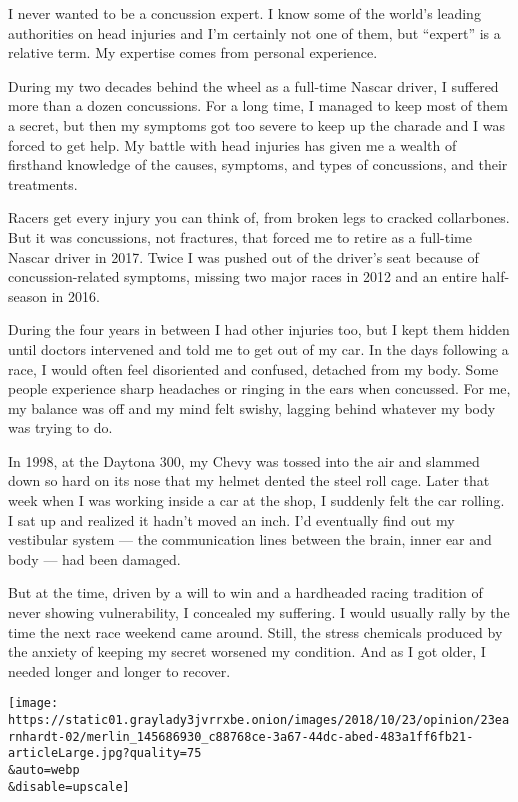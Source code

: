 I never wanted to be a concussion expert. I know some of the world's
leading authorities on head injuries and I'm certainly not one of them,
but ``expert'' is a relative term. My expertise comes from personal
experience.

During my two decades behind the wheel as a full-time Nascar driver, I
suffered more than a dozen concussions. For a long time, I managed to
keep most of them a secret, but then my symptoms got too severe to keep
up the charade and I was forced to get help. My battle with head
injuries has given me a wealth of firsthand knowledge of the causes,
symptoms, and types of concussions, and their treatments.

Racers get every injury you can think of, from broken legs to cracked
collarbones. But it was concussions, not fractures, that forced me to
retire as a full-time Nascar driver in 2017. Twice I was pushed out of
the driver's seat because of concussion-related symptoms, missing two
major races in 2012 and an entire half-season in 2016.

During the four years in between I had other injuries too, but I kept
them hidden until doctors intervened and told me to get out of my car.
In the days following a race, I would often feel disoriented and
confused, detached from my body. Some people experience sharp headaches
or ringing in the ears when concussed. For me, my balance was off and my
mind felt swishy, lagging behind whatever my body was trying to do.

In 1998, at the Daytona 300, my Chevy was tossed into the air and
slammed down so hard on its nose that my helmet dented the steel roll
cage. Later that week when I was working inside a car at the shop, I
suddenly felt the car rolling. I sat up and realized it hadn't moved an
inch. I'd eventually find out my vestibular system --- the communication
lines between the brain, inner ear and body --- had been damaged.

But at the time, driven by a will to win and a hardheaded racing
tradition of never showing vulnerability, I concealed my suffering. I
would usually rally by the time the next race weekend came around.
Still, the stress chemicals produced by the anxiety of keeping my secret
worsened my condition. And as I got older, I needed longer and longer to
recover.

\texttt{[image: https://static01.graylady3jvrrxbe.onion/images/2018/10/23/opinion/23earnhardt-02/merlin\_145686930\_c88768ce-3a67-44dc-abed-483a1ff6fb21-articleLarge.jpg?quality=75\\\&auto=webp\\\&disable=upscale]}

